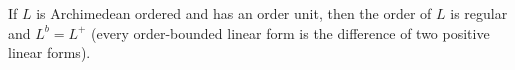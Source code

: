 If $L$ is Archimedean ordered and has an order unit, then the order of $L$ is regular and $L^b = L^+$ (every order-bounded linear form is the difference of two positive linear forms).
